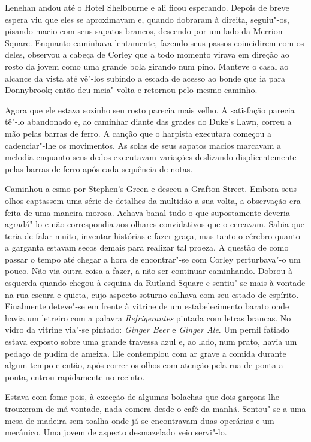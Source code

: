Lenehan andou até o Hotel Shelbourne e ali ficou esperando.  Depois de breve
espera viu que eles se aproximavam e, quando dobraram à direita, seguiu"-os,
pisando macio com seus sapatos brancos, descendo por um lado da Merrion Square.
Enquanto caminhava lentamente, fazendo seus passos coincidirem com os deles,
observou a cabeça de Corley que a todo momento virava em direção ao rosto da
jovem como uma grande bola girando num pino.  Manteve o casal ao alcance da
vista até vê"-los subindo a escada de acesso ao bonde que ia para Donnybrook;
então deu meia"-volta e retornou pelo mesmo caminho.

Agora que ele estava sozinho seu rosto parecia mais velho.  A satisfação
parecia tê"-lo abandonado e, ao caminhar diante das grades do Duke’s Lawn,
correu a mão pelas barras de ferro.  A canção que o harpista executara começou
a cadenciar"-lhe os movimentos.  As solas de seus sapatos macios marcavam a
melodia enquanto seus dedos executavam variações deslizando displicentemente
pelas barras de ferro após cada sequência de notas.

Caminhou a esmo por Stephen’s Green e desceu a Grafton Street.  Embora seus
olhos captassem uma série de detalhes da multidão a sua volta, a observação era
feita de uma maneira morosa.  Achava banal tudo o que supostamente deveria
agradá"-lo e não correspondia aos olhares convidativos que o cercavam.  Sabia
que teria de falar muito, inventar histórias e fazer graça, mas tanto o cérebro
quanto a garganta estavam secos demais para realizar tal proeza.  A questão de
como passar o tempo até chegar a hora de encontrar"-se com Corley perturbava"-o
um pouco.  Não via outra coisa a fazer, a não ser continuar caminhando.  Dobrou
à esquerda quando chegou à esquina da Rutland Square e sentiu"-se mais à vontade
na rua escura e quieta, cujo aspecto soturno calhava com seu estado de
espírito.  Finalmente deteve"-se em frente à vitrine de um estabelecimento
barato onde havia um letreiro com a palavra \textit{Refrigerantes} pintada com
letras brancas.  No vidro da vitrine via"-se pintado: \textit{Ginger Beer} e
\textit{Ginger Ale}.  Um pernil fatiado estava exposto sobre uma grande
travessa azul e, ao lado, num prato, havia um pedaço de pudim de ameixa.  Ele
contemplou com ar grave a comida durante algum tempo e então, após correr os
olhos com atenção pela rua de ponta a ponta, entrou rapidamente no recinto.

Estava com fome pois, à exceção de algumas bolachas que dois garçons lhe
trouxeram de má vontade, nada comera desde o café da manhã.  Sentou"-se a uma
mesa de madeira sem toalha onde já se encontravam duas operárias e um mecânico.
Uma jovem de aspecto desmazelado veio servi"-lo.

